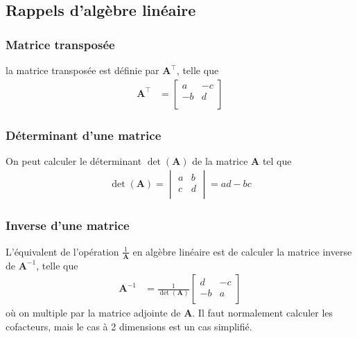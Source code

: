 \documentclass[10pt, french]{article}
\begin{document}
\begin{multicols*}{3}
\subsection*{Rappels d'algèbre linéaire}
\subsubsection*{Matrice transposée} la matrice transposée est définie par $\bm{A}^\top$, telle que
\begin{align*}
\bm{A}^{\top} & = 
\begin{bmatrix}
a	& -c \\
-b	& d \\
\end{bmatrix}
\end{align*}

\subsubsection*{Déterminant d'une matrice} On peut calculer le déterminant $\det(\bm{A})$ de la matrice $\bm{A}$ tel que
\begin{align*}
\det(\bm{A})	  = 
\begin{vmatrix}
a	& b \\
c	& d \\
\end{vmatrix}
= ad - bc
\end{align*}

\subsubsection*{Inverse d'une matrice} L'équivalent de l'opération $\frac{1}{\bm{A}}$ en algèbre linéaire est de calculer la matrice inverse de $\bm{A}^{-1}$, telle que		
\begin{align*}
\bm{A}^{-1}	& = \frac{1}{\det(\bm{A})}
\begin{bmatrix}
d	& -c \\
-b	& a \\
\end{bmatrix}
\end{align*}
où on multiple par la matrice adjointe de $\bm{A}$. Il faut normalement calculer les cofacteurs, mais le cas à 2 dimensions est un cas simplifié.



\end{multicols*}


\end{document}
